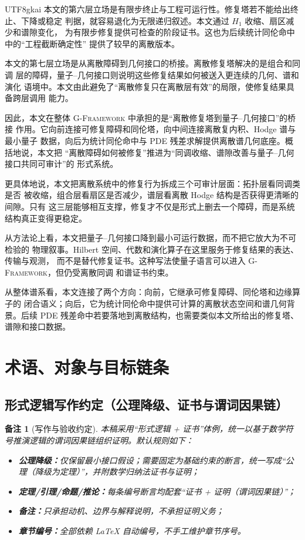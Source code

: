 \documentclass[12pt]{article}
\newtheorem{remark}{备注}[section]
\newcommand{\GFramework}{\textsc{G-Framework}}
\begin{document}
\begin{CJK*}{UTF8}{gkai}
本文的第六层立场是有限步终止与工程可运行性。修复塔若不能给出终止、下降或稳定
判据，就容易退化为无限递归叙述。本文通过 \(H_1\) 收缩、扇区减少和谱隙变化，
为有限步修复提供可检查的阶段证书。这也为后续统计同伦命中中的“工程截断确定性”
提供了较早的离散版本。

本文的第七层立场是从离散障碍到几何接口的桥接。离散修复塔解决的是组合和同调
层的障碍，量子--几何接口则说明这些修复结果如何被送入更连续的几何、谱和演化
语境中。本文由此避免了“离散修复只在离散层有效”的局限，使修复结果具备跨层调用
能力。

因此，本文在整体 \GFramework{} 中承担的是“离散修复塔到量子--几何接口”的桥接
作用。它向前连接可修复障碍和同伦塔，向中间连接离散复内积、Hodge 谱与最小量子
数据，向后为统计同伦命中与 PDE 残差求解提供离散谱几何底座。概括地说，本文把
“离散障碍如何被修复”推进为“同调收缩、谱隙改善与量子--几何接口共同可审计”的
形式系统。

更具体地说，本文把离散系统中的修复行为拆成三个可审计层面：拓扑层看同调类是否
被收缩，组合层看扇区是否减少，谱层看离散 Hodge 结构是否获得更清晰的间隙。只有
这三层能够相互支撑，修复才不仅是形式上删去一个障碍，而是系统结构真正变得更稳定。

从方法论上看，本文把量子--几何接口降到最小可运行数据，而不把它放大为不可检验的
物理叙事。Hilbert 空间、代数和演化算子在这里服务于修复结果的表达、传输与观测，
而不是替代修复证书。这种写法使量子语言可以进入 \GFramework{}，但仍受离散同调
和谱证书约束。

从整体谱系看，本文连接了两个方向：向前，它继承可修复障碍、同伦塔和边缘算子的
闭合语义；向后，它为统计同伦命中提供可计算的离散状态空间和谱几何背景。后续
PDE 残差命中若要落地到离散结构，也需要类似本文所给出的修复塔、谱隙和接口数据。

\setcounter{tocdepth}{2}
\setcounter{secnumdepth}{2}
\tableofcontents
\clearpage

\section{术语、对象与目标链条}

\subsection{形式逻辑写作约定（公理降级、证书与谓词因果链）}
\label{subsec:tex31-writing-convention}

\begin{remark}[写作与验收约定]
本稿采用“形式逻辑 + 证书”体例，统一以基于数学符号推演逻辑的谓词因果链组织证明。默认规则如下：
\begin{itemize}
  \item \textbf{公理降级：}仅保留最小接口假设；需要固定为基础约束的断言，统一写成“公理（降级为定理）”，并附数学归纳法证书与证明；
  \item \textbf{定理/引理/命题/推论：}每条编号断言均配套“证书 + 证明（谓词因果链）”；
  \item \textbf{备注：}只承担动机、边界与解释说明，不承担证明义务；
  \item \textbf{章节编号：}全部依赖 LaTeX 自动编号，不手工维护章节序号。
\end{itemize}
\end{remark}


\end{CJK*}
\end{document}
